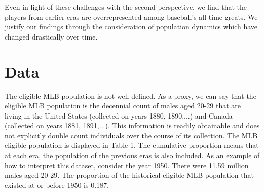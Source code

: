\documentclass[11pt]{article}\usepackage[]{graphicx}\usepackage[]{color}
\begin{document}
Even in light of these challenges with the second perspective, we find that the 
players from earlier eras are overrepresented among baseball's all time greats.  
We justify our findings through the consideration of population dynamics which 
have changed drastically over time.  %



\section{Data}











The eligible MLB population is not well-defined.  As a proxy, we can say 
that the eligible MLB population is the decennial count of males aged 
20-29 that are living in the United States (collected on years 1880, 1890,...) 
and Canada (collected on years 1881, 1891,...).
This information is readily obtainable and does not explicitly double count 
individuals over the course of its collection.  
The MLB eligible population is displayed in Table 1.
The cumulative proportion means that at each era, the population of the 
previous eras is also included. As an example of how to interpret this 
dataset, consider the year 1950. There were 11.59 
million males aged 20-29. The proportion of the historical eligible MLB 
population that existed at or before 1950 is 0.187. 
\end{document}

